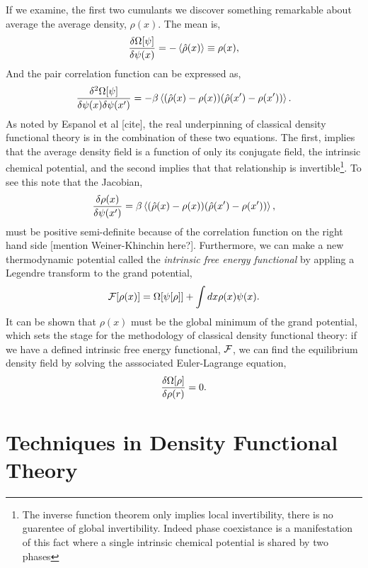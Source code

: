 If we examine, the first two cumulants we discover something remarkable about
average the average density, $\rho(x)$. The mean is,
%
\begin{equation} \frac{\delta \Omega[\psi]}{\delta \psi(x)} = -\left\langle \hat{\rho}(x) \right\rangle \equiv
\rho(x), \end{equation}
%
And the pair correlation function can be expressed as, 
%
\begin{equation} \frac{\delta^2 \Omega[\psi]}{\delta \psi(x) \delta \psi(x^\prime)} = - \beta
\left\langle (\hat{\rho}(x) - \rho(x))(\hat{\rho}(x^\prime) - \rho(x^\prime)) \right\rangle.
\end{equation}
%
As noted by Espanol et al [cite], the real underpinning of classical density
functional theory is in the combination of these two equations.  The first,
implies that the average density field is a function of only its conjugate
field, the intrinsic chemical potential, and the second implies that that
relationship is invertible\footnote{The inverse function theorem only implies
local invertibility, there is no guarentee of global invertibility. Indeed
phase coexistance is a manifestation of this fact where a single intrinsic
chemical potential is shared by two phases}.  To see this note that the
Jacobian, 
%
\begin{equation} \frac{\delta \rho(x)}{\delta \psi(x^\prime)} = \beta \left\langle 
(\hat{\rho}(x) - \rho(x))(\hat{\rho}(x^\prime) - \rho(x^\prime)) \right\rangle,
\end{equation}
%
must be positive semi-definite because of the correlation function on the right
hand side [mention Weiner-Khinchin here?]. Furthermore, we can make a new
thermodynamic potential called the \textit{intrinsic free energy functional} by
appling a Legendre transform to the grand potential,
%
\begin{equation} \mathcal{F}[\rho(x)] = \Omega[\psi[\rho]] + \int dx \rho(x) \psi(x).
\end{equation}
%
It can be shown \cite{HansenAppendixB} that $\rho(x)$ must be the global
minimum of the grand potential, which sets the stage for the methodology of
classical density functional theory: if we have a defined intrinsic free energy
functional, $\mathcal{F}$, we can find the equilibrium density field by solving the
asssociated Euler-Lagrange equation, 
%
\begin{equation} \frac{\delta \Omega[\rho]}{\delta \rho(r)} = 0.  \end{equation}

\section{Techniques in Density Functional Theory} %


